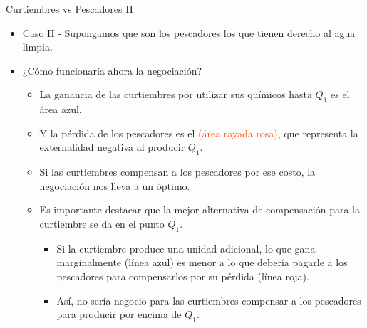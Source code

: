 \documentclass{beamer}
\begin{document}
\begin{frame}{Curtiembres vs Pescadores II}
\begin{itemize}
    \item Caso II - Supongamos que son los pescadores los que tienen derecho al agua limpia. \vspace{1mm}
    \item ¿Cómo funcionaría ahora la negociación? 
    \begin{itemize}
        \item  La ganancia de las curtiembres por utilizar sus químicos hasta $Q_1$ es el \textcolor{blue!50}{área azul}.  
        \item Y la pérdida de los pescadores es el \textcolor{OrangeRed}{(área rayada rosa)}, que representa la externalidad negativa al producir $Q_1$.
        \item Si las curtiembres compensan a los pescadores por ese costo, la negociación nos lleva a un óptimo.
        \vspace{0.5mm}
        \item Es importante destacar que la mejor alternativa de compensación para la curtiembre se da en el punto $Q_1$.
        \begin{itemize}
        \item Si la curtiembre produce una unidad adicional, lo que gana marginalmente (línea azul) es menor a lo que debería pagarle a los pescadores para compensarlos por su pérdida (línea roja).
        \item Así, no sería negocio para las curtiembres compensar a los pescadores para producir por encima de $Q_1$.
        \end{itemize}
    \end{itemize}
\end{itemize}
\end{frame}
\end{document}
